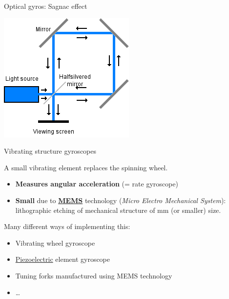\documentclass[compress]{beamer}
\begin{document}
\begin{frame}{Optical gyros: Sagnac effect}
\begin{multicols}{2}
        \vspace{2cm}
        \begin{center}
            \includegraphics[width=0.8\linewidth]{sagnac-effect}
        \end{center}

    \end{multicols}
\end{frame}

\begin{frame}{Vibrating structure gyroscopes}

    A small vibrating element replaces the spinning wheel.

    \begin{itemize}

        \item {\bf Measures angular acceleration} (= rate gyroscope)
        \item {\bf Small} due to
            \href{http://en.wikipedia.org/wiki/Microelectromechanical_systems}{\bf
            MEMS} technology (\emph{Micro Electro Mechanical System}): lithographic
            etching of mechanical structure of mm (or smaller) size.

    \end{itemize}

    Many different ways of implementing this:

    \begin{itemize}

        \item Vibrating wheel gyroscope
        \item \href{http://en.wikipedia.org/wiki/Piezoelectric_effect}{Piezoelectric} element gyroscope
        \item Tuning forks manufactured using MEMS technology
        \item \ldots{}
    \end{itemize}

\end{frame}
\end{document}
